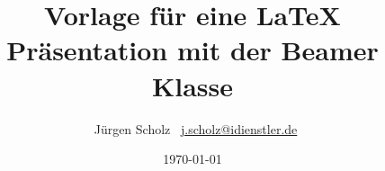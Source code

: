 \documentclass{beamer}
\title{Vorlage für eine \LaTeX{} Präsentation mit der Beamer Klasse}
\author{\texorpdfstring{\ Jürgen Scholz \ \newline\url{j.scholz@idienstler.de}}{Author}}
\institute{iDienstler.de $-$ simply make apps and love the\enquote{i}}
\date{\today}
\begin{document}
 
\frame{\titlepage}
 
\end{document}
